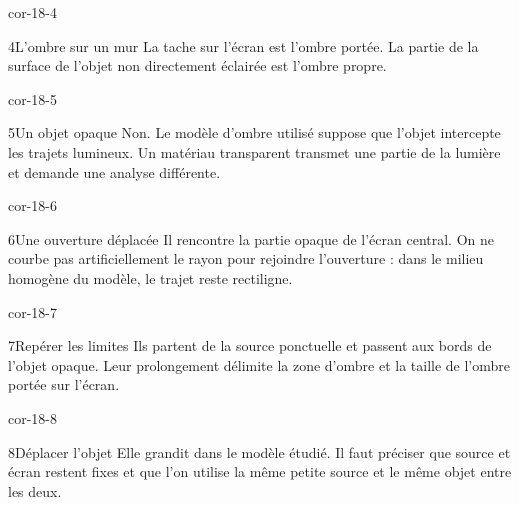 \documentclass[12pt,twoside,openany]{book}
\begin{document}
\begin{blocLivre}{cor-18-4}
\begin{corrige}{4}{L’ombre sur un mur}
La tache sur l’écran est l’ombre portée. La partie de la surface de l’objet non directement éclairée est l’ombre propre.\par
{}
\end{corrige}\end{blocLivre}
\begin{blocLivre}{cor-18-5}
\begin{corrige}{5}{Un objet opaque}
Non. Le modèle d’ombre utilisé suppose que l’objet intercepte les trajets lumineux. Un matériau transparent transmet une partie de la lumière et demande une analyse différente.\par
\end{corrige}\end{blocLivre}
\begin{blocLivre}{cor-18-6}
\begin{corrige}{6}{Une ouverture déplacée}
Il rencontre la partie opaque de l’écran central. On ne courbe pas artificiellement le rayon pour rejoindre l’ouverture : dans le milieu homogène du modèle, le trajet reste rectiligne.\par
{}
\end{corrige}\end{blocLivre}
\begin{blocLivre}{cor-18-7}
\begin{corrige}{7}{Repérer les limites}
Ils partent de la source ponctuelle et passent aux bords de l’objet opaque. Leur prolongement délimite la zone d’ombre et la taille de l’ombre portée sur l’écran.\par
{}
\end{corrige}\end{blocLivre}
\begin{blocLivre}{cor-18-8}
\begin{corrige}{8}{Déplacer l’objet}
Elle grandit dans le modèle étudié. Il faut préciser que source et écran restent fixes et que l’on utilise la même petite source et le même objet entre les deux.\par
\end{corrige}\end{blocLivre}
\end{document}
